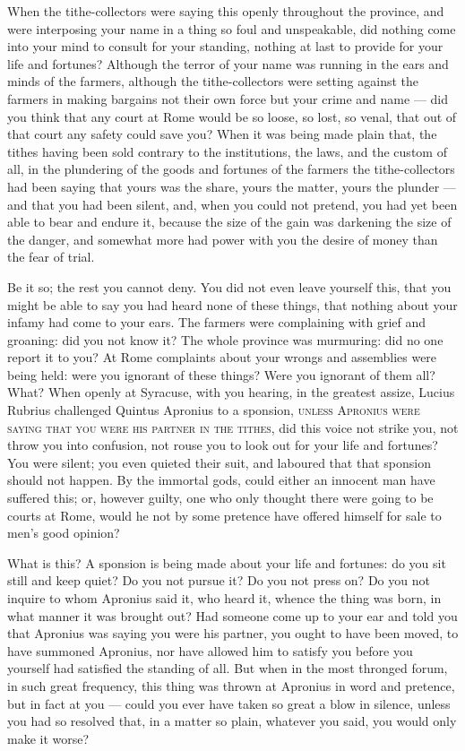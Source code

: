  When the tithe-collectors were saying this openly throughout the province, and were interposing your name in a thing so foul and unspeakable, did nothing come into your mind to consult for your standing, nothing at last to provide for your life and fortunes? Although the terror of your name was running in the ears and minds of the farmers, although the tithe-collectors were setting against the farmers in making bargains not their own force but your crime and name --- did you think that any court at Rome would be so loose, so lost, so venal, that out of that court any safety could save you? When it was being made plain that, the tithes having been sold contrary to the institutions, the laws, and the custom of all, in the plundering of the goods and fortunes of the farmers the tithe-collectors had been saying that yours was the share, yours the matter, yours the plunder --- and that you had been silent, and, when you could not pretend, you had yet been able to bear and endure it, because the size of the gain was darkening the size of the danger, and somewhat more had power with you the desire of money than the fear of trial.

 Be it so; the rest you cannot deny. You did not even leave yourself this, that you might be able to say you had heard none of these things, that nothing about your infamy had come to your ears. The farmers were complaining with grief and groaning: did you not know it? The whole province was murmuring: did no one report it to you? At Rome complaints about your wrongs and assemblies were being held: were you ignorant of these things? Were you ignorant of them all? What? When openly at Syracuse, with you hearing, in the greatest assize, Lucius Rubrius challenged Quintus Apronius to a sponsion, \textsc{unless Apronius were saying that you were his partner in the tithes}, did this voice not strike you, not throw you into confusion, not rouse you to look out for your life and fortunes? You were silent; you even quieted their suit, and laboured that that sponsion should not happen. By the immortal gods, could either an innocent man have suffered this; or, however guilty, one who only thought there were going to be courts at Rome, would he not by some pretence have offered himself for sale to men's good opinion?

 What is this? A sponsion is being made about your life and fortunes: do you sit still and keep quiet? Do you not pursue it? Do you not press on? Do you not inquire to whom Apronius said it, who heard it, whence the thing was born, in what manner it was brought out? Had someone come up to your ear and told you that Apronius was saying you were his partner, you ought to have been moved, to have summoned Apronius, nor have allowed him to satisfy you before you yourself had satisfied the standing of all. But when in the most thronged forum, in such great frequency, this thing was thrown at Apronius in word and pretence, but in fact at you --- could you ever have taken so great a blow in silence, unless you had so resolved that, in a matter so plain, whatever you said, you would only make it worse?

